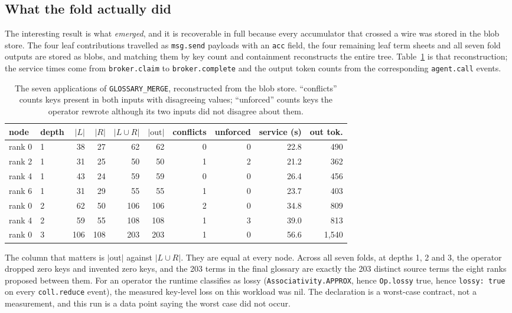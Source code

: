 \documentclass[11pt]{article}
\begin{document}
\subsection{What the fold actually did}

The interesting result is what \emph{emerged}, and it is recoverable in full because every
accumulator that crossed a wire was stored in the blob store. The four leaf contributions
travelled as \texttt{msg.send} payloads with an \texttt{acc} field, the four remaining leaf term
sheets and all seven fold outputs are stored as blobs, and matching them by key count and
containment reconstructs the entire tree. Table~\ref{tab:folds} is that reconstruction; the
service times come from \texttt{broker.claim} to \texttt{broker.complete} and the output token
counts from the corresponding \texttt{agent.call} events.

\begin{table}[htbp]
\centering\small
\begin{tabular}{@{}llrrrrrrrr@{}}
\toprule
node & depth & $|L|$ & $|R|$ & $|L\cup R|$ & $|\text{out}|$ & conflicts & unforced & service (s) & out tok. \\
\midrule
rank 0 & 1 & 38 & 27 & 62 & 62 & 0 & 0 & 22.8 & 490 \\
rank 2 & 1 & 31 & 25 & 50 & 50 & 1 & 2 & 21.2 & 362 \\
rank 4 & 1 & 43 & 24 & 59 & 59 & 0 & 0 & 26.4 & 456 \\
rank 6 & 1 & 31 & 29 & 55 & 55 & 1 & 0 & 23.7 & 403 \\
rank 0 & 2 & 62 & 50 & 106 & 106 & 2 & 0 & 34.8 & 809 \\
rank 4 & 2 & 59 & 55 & 108 & 108 & 1 & 3 & 39.0 & 813 \\
rank 0 & 3 & 106 & 108 & 203 & 203 & 1 & 0 & 56.6 & 1{,}540 \\
\bottomrule
\end{tabular}
\caption{The seven applications of \texttt{GLOSSARY\_MERGE}, reconstructed from the blob store.
``conflicts'' counts keys present in both inputs with disagreeing values; ``unforced'' counts
keys the operator rewrote although its two inputs did not disagree about them.}
\label{tab:folds}
\end{table}

The column that matters is $|\text{out}|$ against $|L\cup R|$. They are equal at every node.
Across all seven folds, at depths 1, 2 and 3, the operator dropped zero keys and invented zero
keys, and the 203 terms in the final glossary are exactly the 203 distinct source terms the
eight ranks proposed between them. For an operator the runtime classifies as lossy
(\texttt{Associativity.APPROX}, hence \texttt{Op.lossy} true, hence \texttt{lossy: true} on
every \texttt{coll.reduce} event), the measured key-level loss on this workload was nil. The
declaration is a worst-case contract, not a measurement, and this run is a data point saying the
worst case did not occur.
\end{document}
